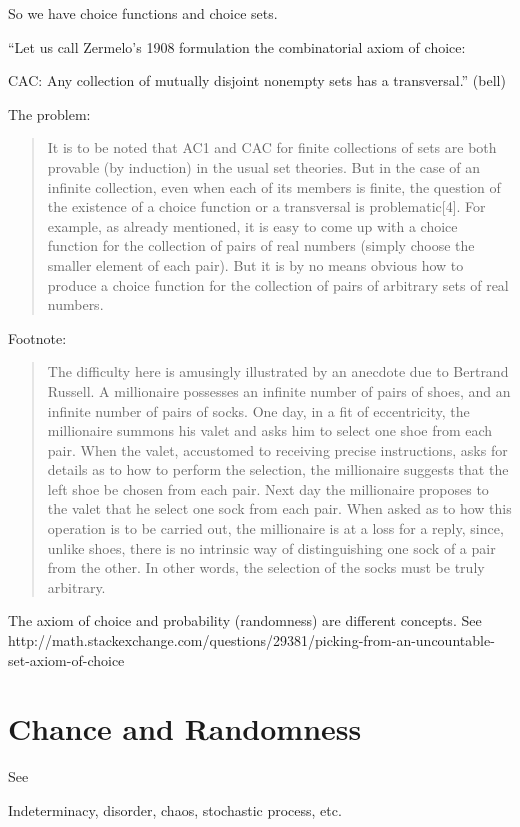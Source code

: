 So we have choice functions and choice sets.


``Let us call Zermelo's 1908 formulation the combinatorial axiom of choice:

CAC: 
Any collection of mutually disjoint nonempty sets has a transversal.'' (bell)


The problem:


\blockquote{It is to be noted that AC1 and CAC for finite collections
  of sets are both provable (by induction) in the usual set
  theories. But in the case of an infinite collection, even when each
  of its members is finite, the question of the existence of a choice
  function or a transversal is problematic[4]. For example, as already
  mentioned, it is easy to come up with a choice function for the
  collection of pairs of real numbers (simply choose the smaller
  element of each pair). But it is by no means obvious how to produce
  a choice function for the collection of pairs of arbitrary sets of
  real numbers.\cite{bell_axiom_2013}}

Footnote: 
\blockquote{The difficulty here is amusingly illustrated by an anecdote due to Bertrand Russell. A millionaire possesses an infinite number of pairs of shoes, and an infinite number of pairs of socks. One day, in a fit of eccentricity, the millionaire summons his valet and asks him to select one shoe from each pair. When the valet, accustomed to receiving precise instructions, asks for details as to how to perform the selection, the millionaire suggests that the left shoe be chosen from each pair. Next day the millionaire proposes to the valet that he select one sock from each pair. When asked as to how this operation is to be carried out, the millionaire is at a loss for a reply, since, unlike shoes, there is no intrinsic way of distinguishing one sock of a pair from the other. In other words, the selection of the socks must be truly arbitrary.}

The axiom of choice and probability (randomness) are different
concepts.  See
http://math.stackexchange.com/questions/29381/picking-from-an-uncountable-set-axiom-of-choice

\section{Chance and Randomness}

See \cite{eagle_chance_2014}

Indeterminacy, disorder, chaos, stochastic process, etc.

